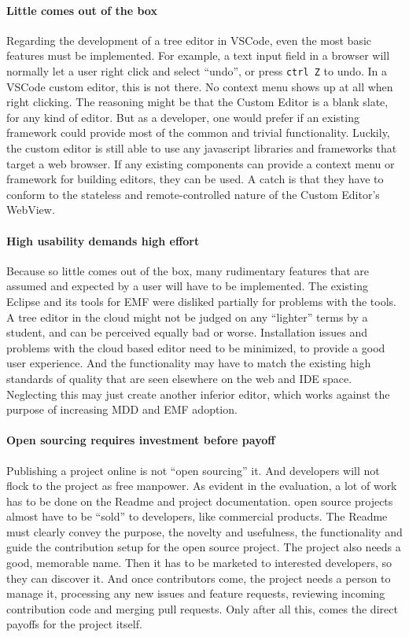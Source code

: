 \paragraph{Little comes out of the box}
Regarding the development of a tree editor in \gls{VSCode}, even the most basic features must be implemented.
For example, a text input field in a browser will normally let a user right click and select ``undo'', or press \texttt{ctrl Z} to undo.
In a \gls{VSCode} custom editor, this is not there.
No context menu shows up at all when right clicking.
The reasoning might be that the Custom Editor is a blank slate, for any kind of editor.
But as a developer, one would prefer if an existing framework could provide most of the common and trivial functionality.
Luckily, the custom editor is still able to use any javascript libraries and frameworks that target a web browser.
If any existing components can provide a context menu or framework for building editors, they can be used.
A catch is that they have to conform to the stateless and remote-controlled nature of the Custom Editor's WebView.

\paragraph{High usability demands high effort}
Because so little comes out of the box, many rudimentary features that are assumed and expected by a user will have to be implemented.
The existing \gls{Eclipse} and its tools for \acrshort{EMF} were disliked partially for problems with the tools.
A tree editor in the cloud might not be judged on any ``lighter'' terms by a student, and can be perceived equally bad or worse.
Installation issues and problems with the cloud based editor need to be minimized, to provide a good user experience.
And the functionality may have to match the existing high standards of quality that are seen elsewhere on the web and \acrshort{IDE} space.
Neglecting this may just create another inferior editor, which works against the purpose of increasing \acrshort{MDD} and \acrshort{EMF} adoption.

\paragraph{Open sourcing requires investment before payoff}
Publishing a project online is not ``open sourcing'' it.
And developers will not flock to the project as free manpower.
As evident in the evaluation, a lot of work has to be done on the Readme and project documentation.
\Gls{open source} projects almost have to be ``sold'' to developers, like commercial products.
The Readme must clearly convey the purpose, the novelty and usefulness, the functionality and guide the contribution setup for the \gls{open source} project.
The project also needs a good, memorable name.
Then it has to be marketed to interested developers, so they can discover it.
And once contributors come, the project needs a person to manage it, processing any new issues and feature requests, reviewing incoming contribution code and merging pull requests.
Only after all this, comes the direct payoffs for the project itself.\\

